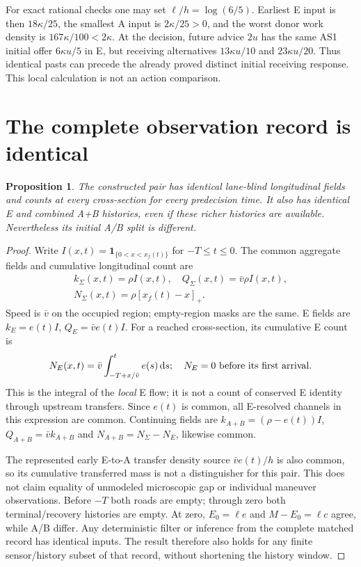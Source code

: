 \documentclass[11pt,a4paper]{article}
\newcommand{\pos}[1]{[#1]_+}
\newcommand{\dd}{\,\mathrm d}
\newtheorem{proposition}{Proposition}
\begin{document}
For exact rational checks one may set $\ell/h=\log(6/5)$. Earliest E input
is then $18\kappa/25$, the smallest A input is $2\kappa/25>0$,
and the worst donor work density is $167\kappa/100<2\kappa$.
At the decision, future advice $2u$ has the same AS1 initial offer
$6\kappa u/5$ in E, but receiving alternatives $13\kappa u/10$ and
$23\kappa u/20$. Thus identical pasts can precede the already proved
distinct initial receiving response. This local calculation is not an
action comparison.

\section{The complete observation record is identical}
\begin{proposition}
The constructed pair has identical lane-blind longitudinal fields and
counts at every cross-section for every predecision time. It also has
identical E and combined A+B histories, even if these richer histories
are available. Nevertheless its initial A/B split is different.
\end{proposition}
\begin{proof}
Write $I(x,t)=\mathbf1_{\{0<x<x_f(t)\}}$ for $-T\leq t\leq0$.
The common aggregate fields and cumulative longitudinal count are
\begin{equation}
 \begin{gathered}
 k_\Sigma(x,t)=\rho I(x,t),\quad
 Q_\Sigma(x,t)=\bar v\rho I(x,t),\\
 N_\Sigma(x,t)=\rho\pos{x_f(t)-x}.
 \end{gathered} \label{eq:aggregate}
\end{equation}
Speed is $\bar v$ on the occupied region; empty-region masks are the same.
E fields are $k_E=e(t)I$, $Q_E=\bar ve(t)I$. For a reached cross-section,
its cumulative E count is
\begin{equation}
 N_E(x,t)=\bar v\int_{-T+x/\bar v}^t e(s)\dd s;
 \quad N_E=0\ \hbox{before its first arrival}.
 \label{eq:Ecount}
\end{equation}
This is the integral of the \emph{local} E flow; it is not a count of
conserved E identity through upstream transfers. Since $e(t)$ is common,
all E-resolved channels in this expression are common. Continuing fields
are $k_{A+B}=(\rho-e(t))I$, $Q_{A+B}=\bar vk_{A+B}$ and
$N_{A+B}=N_\Sigma-N_E$, likewise common.

The represented early E-to-A transfer density source $\bar ve(t)/h$ is
also common, so its cumulative transferred mass is not a distinguisher
for this pair. This does not claim equality of unmodeled microscopic gap
or individual maneuver observations. Before $-T$ both roads are empty;
through zero both terminal/recovery histories are empty. At zero,
$E_0=\ell e$ and $M-E_0=\ell c$ agree, while A/B differ. Any deterministic
filter or inference from the complete matched record has identical inputs.
The result therefore also holds for any finite sensor/history subset of
that record, without shortening the history window.
\end{proof}
\end{document}
